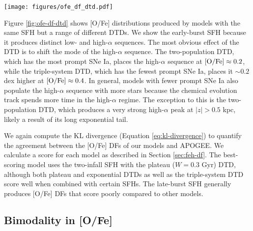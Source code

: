 \documentclass[twocolumn,twocolappendix,linenumbers,trackchanges]{aastex631}
\begin{document}
\begin{figure*}
    \centering
    \texttt{[image: figures/ofe\_df\_dtd.pdf]}
    \caption{Distributions of [O/Fe] from multi-zone models with different DTDs. In all cases an early-burst SFH is assumed. The plot format is similar to Figure \ref{fig:ofe-df-sfh}.}
    \label{fig:ofe-df-dtd}
\end{figure*}

Figure \ref{fig:ofe-df-dtd} shows [O/Fe] distributions produced by models with the same SFH but a range of different DTDs. We show the early-burst SFH because it produces distinct low- and high-$\alpha$ sequences. The most obvious effect of the DTD is to shift the mode of the high-$\alpha$ sequence. The two-population DTD, which has the most prompt SNe Ia, places the high-$\alpha$ sequence at ${\rm [O/Fe]}\approx 0.2$, while the triple-system DTD, which has the fewest prompt SNe Ia, places it $\sim0.2$ dex higher at ${\rm [O/Fe]}\approx0.4$. In general, models with fewer prompt SNe Ia also populate the high-$\alpha$ sequence with more stars because the chemical evolution track spends more time in the high-$\alpha$ regime. The exception to this is the two-population DTD, which produces a very strong high-$\alpha$ peak at $|z|>0.5$ kpc, likely a result of its long exponential tail.

We again compute the KL divergence (Equation \ref{eq:kl-divergence}) to quantify the agreement between the [O/Fe] DFs of our models and APOGEE. We calculate a score for each model as described in Section \ref{sec:feh-df}. The best-scoring model uses the two-infall SFH with the plateau ($W=0.3$ Gyr) DTD, although both plateau and exponential DTDs as well as the triple-system DTD score well when combined with certain SFHs. The late-burst SFH generally produces [O/Fe] DFs that score poorly compared to other models.

\subsection{Bimodality in [O/Fe]}
\label{sec:bimodality}
\end{document}

